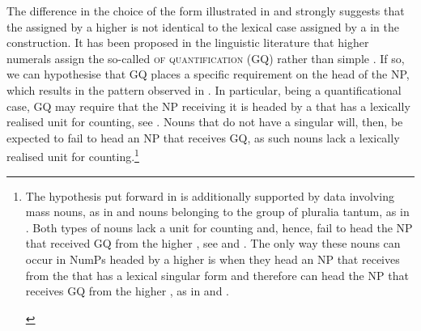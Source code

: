 \documentclass[output=paper,modfonts,newtxmath,hidelinks]{langscibook}
\begin{document}
\noindent The difference in the choice of the  form illustrated in  and  strongly suggests that the  assigned by a higher  is not identical to the lexical case assigned by a  in the  construction. It has been proposed in the linguistic literature that  higher numerals assign the so-called \textsc{ of quantification} (GQ) rather than simple  \citep{Bošković2006}. If so, we can hypothesise that GQ places a specific requirement on the head of the NP, which results in the pattern observed in . In particular, being a quantificational case, GQ may require that the NP receiving it is headed by a  that has a lexically realised unit for counting, see . Nouns that do not have a singular  will, then, be expected to fail to head an NP that receives GQ, as such nouns lack a lexically realised unit for counting.\footnote{\label{18:fn4}The hypothesis put forward in  is additionally supported by data involving mass nouns, as in  and nouns belonging to the group of pluralia tantum, as in . Both types of nouns lack a unit for counting and, hence, fail to head the NP that received GQ from the higher , see  and . The only way these nouns can occur in NumPs headed by a higher  is when they head an NP that receives  from the  that has a lexical singular form and therefore can head the NP that receives GQ from the higher , as in  and .

\begin{multicols}{2}
\ea \label{18:fn4i}
	\label{18:fn4ia}
    \label{18:fn4ib}
    \z
\z

\columnbreak

\ea \label{18:fn4ii}
	\label{18:fn4iia}
    \label{18:fn4iib}
    \z
\z


\end{multicols}}
\end{document}
